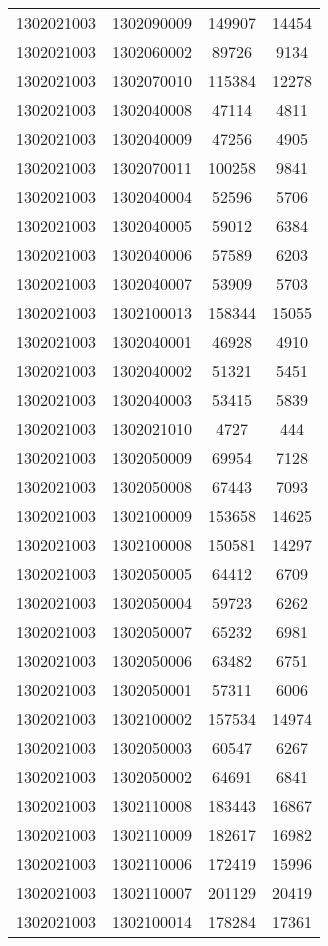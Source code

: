 \begin{longtable}{llcc}
1302021003 & 1302090009 & 149907 & 14454\\
1302021003 & 1302060002 & 89726 & 9134\\
1302021003 & 1302070010 & 115384 & 12278\\
1302021003 & 1302040008 & 47114 & 4811\\
1302021003 & 1302040009 & 47256 & 4905\\
1302021003 & 1302070011 & 100258 & 9841\\
1302021003 & 1302040004 & 52596 & 5706\\
1302021003 & 1302040005 & 59012 & 6384\\
1302021003 & 1302040006 & 57589 & 6203\\
1302021003 & 1302040007 & 53909 & 5703\\
1302021003 & 1302100013 & 158344 & 15055\\
1302021003 & 1302040001 & 46928 & 4910\\
1302021003 & 1302040002 & 51321 & 5451\\
1302021003 & 1302040003 & 53415 & 5839\\
1302021003 & 1302021010 & 4727 & 444\\
1302021003 & 1302050009 & 69954 & 7128\\
1302021003 & 1302050008 & 67443 & 7093\\
1302021003 & 1302100009 & 153658 & 14625\\
1302021003 & 1302100008 & 150581 & 14297\\
1302021003 & 1302050005 & 64412 & 6709\\
1302021003 & 1302050004 & 59723 & 6262\\
1302021003 & 1302050007 & 65232 & 6981\\
1302021003 & 1302050006 & 63482 & 6751\\
1302021003 & 1302050001 & 57311 & 6006\\
1302021003 & 1302100002 & 157534 & 14974\\
1302021003 & 1302050003 & 60547 & 6267\\
1302021003 & 1302050002 & 64691 & 6841\\
1302021003 & 1302110008 & 183443 & 16867\\
1302021003 & 1302110009 & 182617 & 16982\\
1302021003 & 1302110006 & 172419 & 15996\\
1302021003 & 1302110007 & 201129 & 20419\\
1302021003 & 1302100014 & 178284 & 17361\\

\end{longtable}
